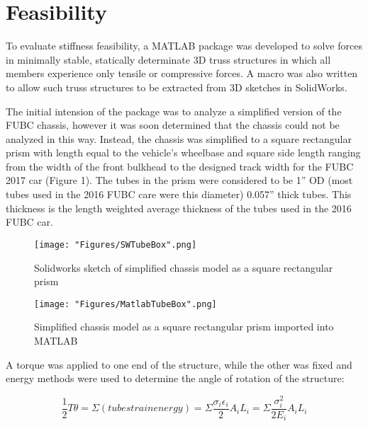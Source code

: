 \documentclass[a4paper]{article}
\numberwithin{equation}{section}
\begin{document}
\section{Feasibility} \label{Feasibility}
To evaluate stiffness feasibility, a MATLAB package was developed to solve forces in minimally stable, statically determinate 3D truss structures in which all members experience only tensile or compressive forces. A macro was also written to allow such truss structures to be extracted from 3D sketches in SolidWorks.

The initial intension of the package was to analyze a simplified version of the FUBC chassis, however it was soon determined that the chassis could not be analyzed in this way. Instead, the chassis was simplified to a square rectangular prism with length equal to the vehicle’s wheelbase and square side length ranging from the width of the front bulkhead to the designed track width for the FUBC 2017 car (Figure 1). The tubes in the prism were considered to be 1” OD (most tubes used in the 2016 FUBC care were this diameter) 0.057” thick tubes. This thickness is the length weighted average thickness of the tubes used in the 2016 FUBC car. 

\begin{figure}[h]
	\begin{center}
		\texttt{[image: "Figures/SWTubeBox".png]}
	\end{center}
	
	\caption{Solidworks sketch of simplified chassis model as a square rectangular prism}
	\label{fig:SWTubeBox}
\end{figure}

\begin{figure}[h]
	\begin{center}
		\texttt{[image: "Figures/MatlabTubeBox".png]}
	\end{center}
	
	\caption{Simplified chassis model as a square rectangular prism imported into MATLAB}
	\label{fig:MatlabTubeBox}
\end{figure}

A torque was applied to one end of the structure, while the other was fixed and energy methods were used to determine the angle of rotation of the structure:

\begin{equation}
\frac{1}{2}T\theta = \Sigma(tube strain energy)=\Sigma\frac{\sigma_i\epsilon_i}{2}A_i L_i = \Sigma\frac{\sigma_i^2}{2E_i}A_i L_i
\end{equation}
\end{document}
